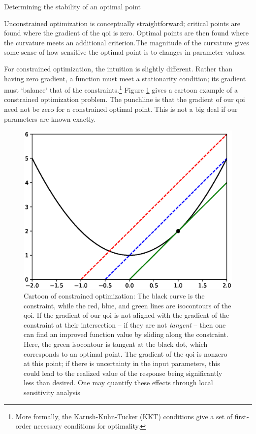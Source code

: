 \documentclass[../primer.tex]{subfiles}
\begin{document}
Determining the stability of an optimal point

Unconstrained optimization is conceptually straightforward; critical points are
found where the gradient of the qoi is zero. Optimal points are then found where
the curvature meets an additional criterion.\footnotemark The magnitude of the
curvature gives some sense of how sensitive the optimal point is to changes in
parameter values.


For constrained optimization, the intuition is slightly different. Rather than
having zero gradient, a function must meet a stationarity condition; its
gradient must `balance' that of the constraints.\footnote{More formally, the
Karush-Kuhn-Tucker (KKT) conditions give a set of first-order necessary
conditions for optimality.} Figure \ref{fig:opt} gives a cartoon example of a
constrained optimization problem. The punchline is that the gradient of our qoi
need not be zero for a constrained optimal point. This is not a big deal if our
parameters are known exactly.

\begin{figure}[!ht]
  \centering
  \includegraphics{./images/ex2}
  \caption{Cartoon of constrained optimization: The black curve is the
    constraint, while the red, blue, and green lines are isocontours of
    the qoi. If the gradient of our qoi is not aligned with the gradient
    of the constraint at their intersection -- if they are not \emph{tangent}
    -- then one can find an improved function value by sliding along the
    constraint. Here, the green isocontour is tangent at the black dot,
    which corresponds to an optimal point. The gradient of the qoi is
    nonzero at this point; if there is uncertainty in the input parameters,
    this could lead to the realized value of the response being significantly
    less than desired. One may quantify these effects through local sensitivity
    analysis}
  \label{fig:opt}
\end{figure}
\end{document}
